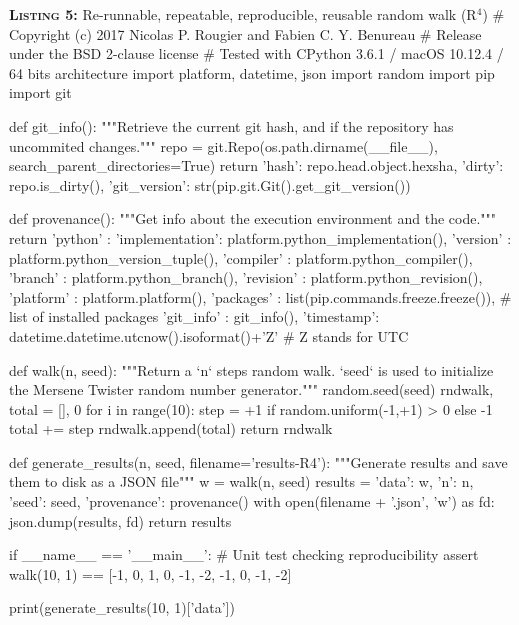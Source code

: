 \documentclass[a4paper,11pt]{article}
\begin{document}
\noindent \begin{minipage}[c]{\linewidth}
\begin{code}{\textbf{\textsc{Listing 5:}} Re-runnable, repeatable, reproducible, reusable random walk (R$^4$)}
# Copyright (c) 2017 Nicolas P. Rougier and Fabien C. Y. Benureau
# Release under the BSD 2-clause license
# Tested with CPython 3.6.1 / macOS 10.12.4 / 64 bits architecture
import platform, datetime, json
import random
import pip
import git

def git_info():
    """Retrieve the current git hash, and if the repository has uncommited changes."""
    repo = git.Repo(os.path.dirname(__file__), search_parent_directories=True)
    return {'hash': repo.head.object.hexsha, 'dirty': repo.is_dirty(),
            'git_version': str(pip.git.Git().get_git_version())}

def provenance():
    """Get info about the execution environment and the code."""
    return {'python'   : {'implementation': platform.python_implementation(),
                          'version'       : platform.python_version_tuple(),
                          'compiler'      : platform.python_compiler(),
                          'branch'        : platform.python_branch(),
                          'revision'      : platform.python_revision()},
            'platform' : platform.platform(),
            'packages'  : list(pip.commands.freeze.freeze()), # list of installed packages
            'git_info' : git_info(),
            'timestamp': datetime.datetime.utcnow().isoformat()+'Z'}  # Z stands for UTC

def walk(n, seed):
    """Return a `n` steps random walk.
    `seed` is used to initialize the Mersene Twister random number generator."""
    random.seed(seed)
    rndwalk, total = [], 0
    for i in range(10):
        step = +1 if random.uniform(-1,+1) > 0 else -1
        total += step
        rndwalk.append(total)
    return rndwalk

def generate_results(n, seed, filename='results-R4'):
    """Generate results and save them to disk as a JSON file"""
    w = walk(n, seed)
    results = {'data': w, 'n': n, 'seed': seed, 'provenance': provenance()}
    with open(filename + '.json', 'w') as fd:
        json.dump(results, fd)
    return results

if __name__ == '__main__':
    # Unit test checking reproducibility
    assert walk(10, 1) == [-1, 0, 1, 0, -1, -2, -1, 0, -1, -2]

    print(generate_results(10, 1)['data'])
\end{code}
\end{minipage}\\
\end{document}
